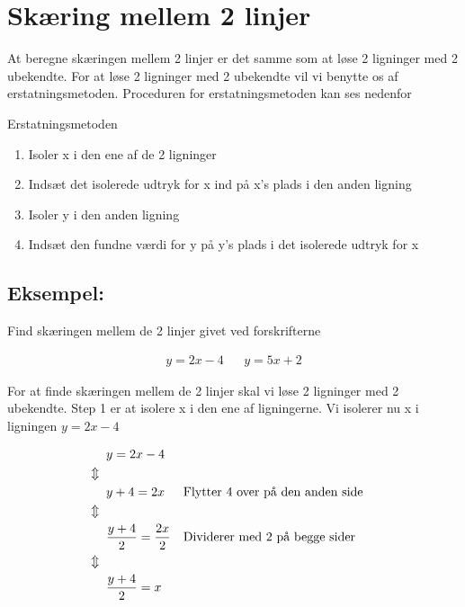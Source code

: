 \section*{Skæring mellem 2 linjer}

At beregne skæringen mellem 2 linjer er det samme som at løse 2 ligninger med 2 ubekendte. For at løse 2 ligninger med 2 ubekendte vil vi benytte os af erstatningsmetoden. Proceduren for erstatningsmetoden kan ses nedenfor

\begin{frm-thm}{Erstatningsmetoden}
\begin{enumerate}
\item Isoler x i den ene af de 2 ligninger
\item Indsæt det isolerede udtryk for x ind på x's plads i den anden ligning
\item Isoler y i den anden ligning
\item Indsæt den fundne værdi for y på y's plads i det isolerede udtryk for x
\end{enumerate}

\end{frm-thm}

\subsection*{Eksempel:}

Find skæringen mellem de 2 linjer givet ved forskrifterne

\begin{align*}
y = 2x - 4 && y = 5x + 2
\end{align*}

For at finde skæringen mellem de 2 linjer skal vi løse 2 ligninger med 2 ubekendte. Step 1 er at isolere x i den ene af ligningerne. Vi isolerer nu x i ligningen $y = 2x - 4$

\begin{align*}
&y = 2x - 4\\
\Updownarrow \hspace*{2mm} &\\
&y + 4 = 2x && \text{Flytter 4 over på den anden side}\\
\Updownarrow \hspace*{2mm} &\\
&\frac{y + 4}{2} = \frac{2x}{2} && \text{Dividerer med 2 på begge sider}\\
\Updownarrow \hspace*{2mm} &\\
&\frac{y + 4}{2} = x
\end{align*}

